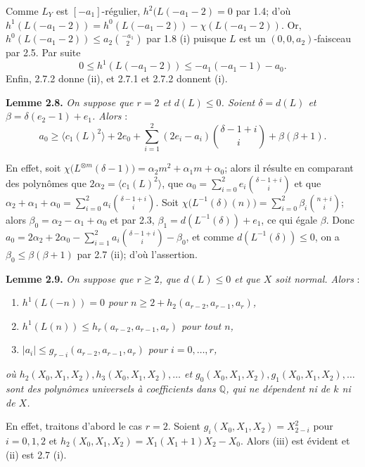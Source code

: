 Comme \(L_Y\) est \([-a_1]\)-régulier, \(h^2(L(-a_1-2)=0\) par 1.4; d'où \(h^1(L(-a_1-2))=h^0(L(-a_1-2))-\chi(L(-a_1-2))\). Or, \(h^0(L(-a_1-2))\le a_2\binom{-a_1}{2}\) par 1.8 (i) puisque \(L\) est un \((0,0,a_2)\)-faisceau par 2.5. Par suite
\[
0\le h^1(L(-a_1-2))\le -a_1(-a_1-1)-a_0.
\tag{2.7.2}
\]
Enfin, 2.7.2 donne (ii), et 2.7.1 et 2.7.2 donnent (i).

\textbf{Lemme 2.8.} \emph{On suppose que \(r=2\) et \(d(L)\le0\). Soient \(\delta=d(L)\) et \(\beta=\delta(e_2-1)+e_1\). Alors} :
\[
a_0\ge
\langle c_1(L)^2\rangle+2e_0+
\sum_{i=1}^{2}(2e_i-a_i)\binom{\delta-1+i}{i}
+\beta(\beta+1).
\]

En effet, soit \(\chi\bigl(L^{\otimes m}(\delta-1)\bigr)=\alpha_2m^2+\alpha_1m+\alpha_0\); alors il résulte en comparant des polynômes que \(2\alpha_2=\langle c_1(L)^2\rangle\), que \(\alpha_0=\sum_{i=0}^{2}e_i\binom{\delta-1+i}{i}\) et que \(\alpha_2+\alpha_1+\alpha_0=\sum_{i=0}^{2}a_i\binom{\delta-1+i}{i}\). Soit \(\chi\bigl(L^{-1}(\delta)(n)\bigr)=\sum_{i=0}^{2}\beta_i\binom{n+i}{i}\); alors \(\beta_0=\alpha_2-\alpha_1+\alpha_0\) et par 2.3, \(\beta_1=d(L^{-1}(\delta))+e_1\), ce qui égale \(\beta\). Donc \(a_0=2\alpha_2+2\alpha_0-\sum_{i=1}^{2}a_i\binom{\delta-1+i}{i}-\beta_0\), et comme \(d(L^{-1}(\delta))\le0\), on a \(\beta_0\le\beta(\beta+1)\) par 2.7 (ii); d'où l'assertion.

\textbf{Lemme 2.9.} \emph{On suppose que \(r\ge2\), que \(d(L)\le0\) et que \(X\) soit normal. Alors} :
\begin{enumerate}[label=(\roman*)]
\item \emph{\(h^1(L(-n))=0\) pour \(n\ge2+h_2(a_{r-2},a_{r-1},a_r)\),}
\item \emph{\(h^1(L(n))\le h_r(a_{r-2},a_{r-1},a_r)\) pour tout \(n\),}
\item \emph{\(|a_i|\le g_{r-i}(a_{r-2},a_{r-1},a_r)\) pour \(i=0,\ldots,r\),}
\end{enumerate}
\emph{où \(h_2(X_0,X_1,X_2),h_3(X_0,X_1,X_2),\ldots\) et \(g_0(X_0,X_1,X_2),g_1(X_0,X_1,X_2),\ldots\) sont des polynômes universels à coefficients dans \(\mathbb Q\), qui ne dépendent ni de \(k\) ni de \(X\).}

En
effet, traitons d'abord le cas \(r=2\). Soient \(g_i(X_0,X_1,X_2)=X_{2-i}^2\) pour \(i=0,1,2\) et \(h_2(X_0,X_1,X_2)=X_1(X_1+1)X_2-X_0\). Alors (iii) est évident et (ii) est 2.7 (i).


